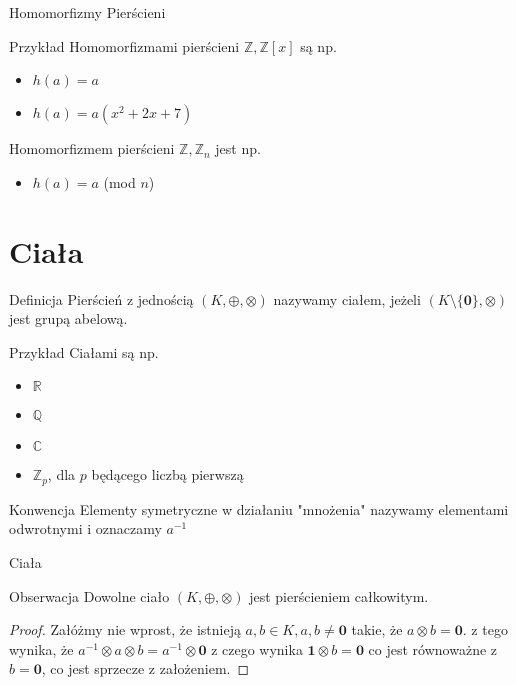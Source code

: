 \documentclass{beamer}
\begin{document}
\begin{frame}{Homomorfizmy Pierścieni}
    \begin{exampleblock}{Przykład}
        Homomorfizmami pierścieni $\mathbb{Z}, \mathbb{Z}[x]$ są np.
        \begin{itemize}
            \item $h(a) = a$
            \item $h(a) = a(x^2 + 2x +7)$
        \end{itemize}
        Homomorfizmem pierścieni $\mathbb{Z}, \mathbb{Z}_n$ jest np.
        \begin{itemize}
            \item $h(a) = a $ (mod $n$)
        \end{itemize}
    \end{exampleblock}
\end{frame}

\section{Ciała}

\begin{frame}
    \begin{block}{Definicja}
        Pierścień z jednością $(K, \oplus, \otimes)$ nazywamy ciałem, jeżeli $(K\setminus \{\mathbf{0}\}, \otimes)$ jest grupą abelową.
    \end{block}
    \begin{exampleblock}{Przykład}
        Ciałami są np.
        \begin{itemize}
            \item $\mathbb{R}$
            \item $\mathbb{Q}$
            \item $\mathbb{C}$
            \item $\mathbb{Z}_p$, dla $p$ będącego liczbą pierwszą
        \end{itemize}
    \end{exampleblock}
    \begin{alertblock}{Konwencja}
        Elementy symetryczne w działaniu "mnożenia" nazywamy elementami odwrotnymi i oznaczamy $a^{-1}$
    \end{alertblock}
\end{frame}

\begin{frame}{Ciała}
    \begin{block}{Obserwacja}
        Dowolne ciało $(K, \oplus, \otimes)$ jest pierścieniem całkowitym.
    \end{block}
    \pause 
    \begin{proof}
        Załóżmy nie wprost, że istnieją $ a,b \in K, a,b \neq \mathbf{0 }$ takie, że $ a \otimes b = \mathbf{0} $. z tego wynika, że
        $a^{-1} \otimes a \otimes b = a^{-1} \otimes \mathbf{0} $ z czego wynika $ \mathbf{1} \otimes b = \mathbf{0} $ co jest równoważne z $b = \mathbf{0}$, co jest sprzecze z założeniem.    
    \end{proof}
\end{frame}
\end{document}
